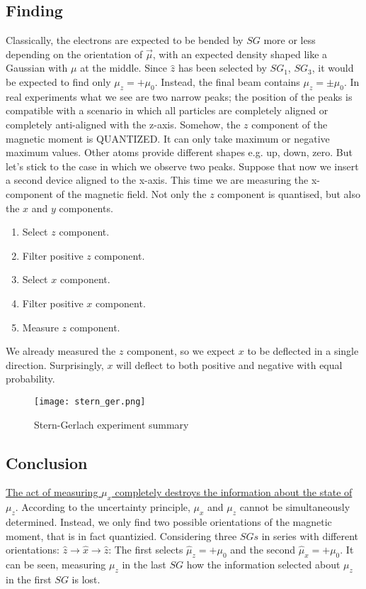   \subsection{Finding}
  Classically, the electrons are expected to be bended by $SG$ more or less depending on the orientation of $\vec{\mu}$, with an expected density shaped like a Gaussian with $\mu$ at the middle.
  Since $\hat{z}$ has been selected by $SG_1$, $SG_3$, it would be expected to find only $\mu_z = + \mu_0$. Instead, the final beam contains $\mu_z =\pm \mu_0$.
  In real experiments what we see are two narrow peaks; the position of the peaks is compatible with a scenario in which all particles are completely aligned or completely anti-aligned with the z-axis.
  Somehow, the $z$ component of the magnetic moment is QUANTIZED.
  It can only take maximum or negative maximum values.
  Other atoms provide different shapes e.g. up, down, zero.
  But let’s stick to the case in which we observe two peaks.
  Suppose that now we insert a second device aligned to the x-axis.
  This time we are measuring the x-component of the magnetic field.
  Not only the $z$ component is quantised, but also the $x$ and $y$ components.

  \begin{multicols}{2}
    \begin{enumerate}
      \item Select $z$ component.
      \item Filter positive $z$ component.
      \item Select $x$ component.
      \item Filter positive $x$ component.
      \item Measure $z$ component.
    \end{enumerate}
  \end{multicols}

  We already measured the $z$ component, so we expect $x$ to be deflected in a single direction. Surprisingly, $x$ will deflect to both positive and negative with equal probability.

\begin{figure}[h!]
    \centering
    \texttt{[image: stern\_ger.png]}
    \caption{\label{fig:stern_ger} Stern-Gerlach experiment summary}
\end{figure}
  \subsection{Conclusion}
  \underline{The act of measuring $\mu_x$ completely destroys the information about the state of $\mu_z$}.
  According to the uncertainty principle, $\mu_x$ and $\mu_z$ cannot be simultaneously determined.
  Instead, we only find two possible orientations of the magnetic moment, that is in fact quantizied.
  Considering three $SGs$ in series with different orientations: $\hat{z}\rightarrow\hat{x}\rightarrow\hat{z}$:
  The first selects $\hat{\mu}_z = +\mu_0$ and the second $\hat{\mu}_x = +\mu_0$.
  It can be seen, measuring $\mu_z$ in the last $SG$ how the information selected about $\mu_z$ in the first $SG$ is lost.

